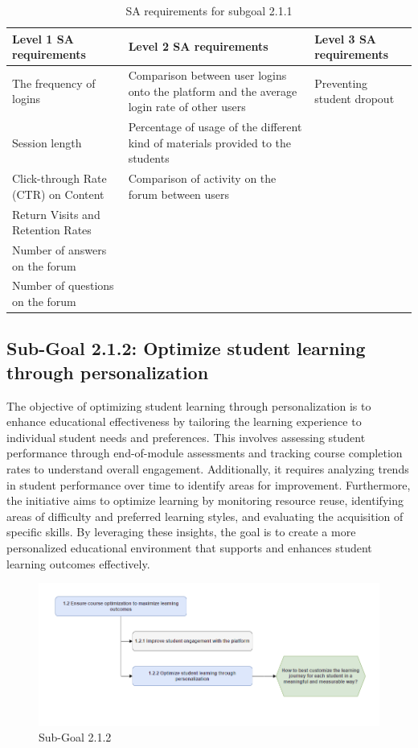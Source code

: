 \begin{table}[H]
\begin{center}
\begin{tabular}{ | m{5cm} | m{5cm}| m{5cm} | } 
  \hline
  \textbf{Level 1 SA requirements} & \textbf{Level 2 SA requirements}  & \textbf{Level 3 SA requirements}  \\ 
  \hline
  The frequency of logins & Comparison between user logins onto the platform and the average login rate of other users & Preventing student dropout \\ 
  \hline
  Session length & Percentage of usage of the different kind of materials provided to the students & \\ 
  \hline
  Click-through Rate (CTR) on Content & Comparison of activity on the forum between users & \\ 
  \hline
  Return Visits and Retention Rates &  & \\ 
  \hline
  Number of answers on the forum &  & \\ 
  \hline
  Number of questions on the forum &  & \\ 
  \hline
\end{tabular}
\end{center}
\caption{SA requirements for subgoal 2.1.1}
\end{table}

\newpage
\subsection{Sub-Goal 2.1.2: Optimize student learning through personalization}
The objective of optimizing student learning through personalization is to enhance educational effectiveness by tailoring the learning experience to individual student needs and preferences. This involves assessing student performance through end-of-module assessments and tracking course completion rates to understand overall engagement. Additionally, it requires analyzing trends in student performance over time to identify areas for improvement. Furthermore, the initiative aims to optimize learning by monitoring resource reuse, identifying areas of difficulty and preferred learning styles, and evaluating the acquisition of specific skills. By leveraging these insights, the goal is to create a more personalized educational environment that supports and enhances student learning outcomes effectively.
\begin{figure}[H]
    \centering
    \includegraphics[width=\textwidth]{./assets/subgoal_1.2.2.png}
    \caption{Sub-Goal 2.1.2}
    \label{fig:subgoal1.2.2}
\end{figure}

